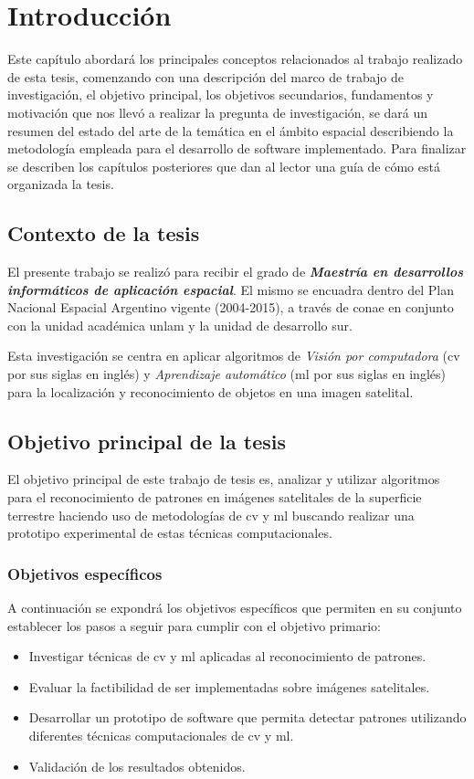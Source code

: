 \chapter{Introducción}\label{chap:introduccion}

Este capítulo abordará los principales conceptos relacionados al trabajo realizado de esta tesis, comenzando con una descripción del marco de trabajo de investigación, el objetivo principal, los objetivos secundarios, fundamentos y motivación que nos llevó a realizar la pregunta de investigación, se dará un resumen del estado del arte de la temática en el ámbito espacial describiendo la metodología empleada para el desarrollo de software implementado.  Para finalizar se describen los capítulos posteriores que dan al lector una guía de cómo está organizada la tesis.


\section{Contexto de la tesis}\label{sec:contexto}
El presente trabajo se realizó para recibir el grado de \textbf{\textit{Maestría en desarrollos informáticos de aplicación espacial}}. El mismo se encuadra dentro del Plan Nacional Espacial Argentino vigente (2004-2015), a través de \ac{conae} en conjunto con la unidad académica \ac{unlam} y la unidad de desarrollo \ac{sur}.

Esta investigación se centra en aplicar  algoritmos de \textit{Visión por computadora} (\ac{cv} por sus siglas en inglés)  y \textit{Aprendizaje automático} (\ac{ml} por sus siglas en inglés) para la localización y reconocimiento de objetos en una imagen satelital.


\section{Objetivo principal de la tesis}\label{sec:obj_general}

El objetivo principal de este trabajo de tesis es, analizar y utilizar algoritmos para el  reconocimiento de patrones en imágenes satelitales de la superficie terrestre haciendo uso de metodologías de \ac{cv} y \ac{ml} buscando realizar una prototipo experimental de estas técnicas computacionales.


\subsection{Objetivos específicos }\label{sub:obj_especifico}
A continuación se expondrá los objetivos específicos que permiten en su conjunto establecer los pasos a seguir para  cumplir con el objetivo primario:
\begin{itemize}
 \item Investigar técnicas de \ac{cv} y \ac{ml} aplicadas al reconocimiento de patrones.
 \item Evaluar la factibilidad de ser implementadas sobre imágenes satelitales.
 \item Desarrollar un prototipo de software que permita detectar patrones utilizando diferentes técnicas computacionales de \ac{cv} y \ac{ml}.
 \item Validación de los resultados obtenidos.
\end{itemize}


